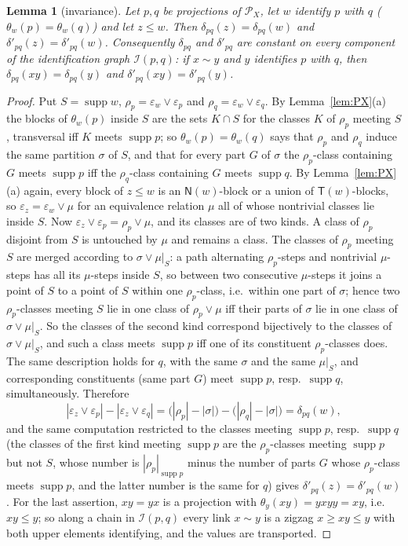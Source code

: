 \documentclass[11pt]{amsart}
\newtheorem{lemma}[theorem]{Lemma}
\theoremstyle{definition}
\renewcommand{\P}{\mathcal{P}}
\newcommand{\supp}{\operatorname{supp}}
\newcommand{\T}{\mathsf{T}}
\newcommand{\N}{\mathsf{N}}
\begin{document}
\begin{lemma}[invariance]\label{lem:count}
Let $p,q$ be projections of $\P_X$, let $w$ identify $p$ with $q$ ($\theta_w(p)=\theta_w(q)$) and let $z\le w$. Then $\delta_{pq}(z)=\delta_{pq}(w)$ and $\delta'_{pq}(z)=\delta'_{pq}(w)$. Consequently $\delta_{pq}$ and $\delta'_{pq}$ are constant on every component of the identification graph $\mathcal I(p,q)$: if $x\sim y$ and $y$ identifies $p$ with $q$, then $\delta_{pq}(xy)=\delta_{pq}(y)$ and $\delta'_{pq}(xy)=\delta'_{pq}(y)$.
\end{lemma}

\begin{proof}
Put $S=\supp w$, $\rho_p=\varepsilon_w\vee\varepsilon_p$ and $\rho_q=\varepsilon_w\vee\varepsilon_q$. By Lemma~\ref{lem:PX}(a) the blocks of $\theta_w(p)$ inside $S$ are the sets $K\cap S$ for the classes $K$ of $\rho_p$ meeting $S$, transversal iff $K$ meets $\supp p$; so $\theta_w(p)=\theta_w(q)$ says that $\rho_p$ and $\rho_q$ induce the same partition $\sigma$ of $S$, and that for every part $G$ of $\sigma$ the $\rho_p$-class containing $G$ meets $\supp p$ iff the $\rho_q$-class containing $G$ meets $\supp q$. By Lemma~\ref{lem:PX}(a) again, every block of $z\le w$ is an $\N(w)$-block or a union of $\T(w)$-blocks, so $\varepsilon_z=\varepsilon_w\vee\mu$ for an equivalence relation $\mu$ all of whose nontrivial classes lie inside $S$. Now $\varepsilon_z\vee\varepsilon_p=\rho_p\vee\mu$, and its classes are of two kinds. A class of $\rho_p$ disjoint from $S$ is untouched by $\mu$ and remains a class. The classes of $\rho_p$ meeting $S$ are merged according to $\sigma\vee\mu|_S$: a path alternating $\rho_p$-steps and nontrivial $\mu$-steps has all its $\mu$-steps inside $S$, so between two consecutive $\mu$-steps it joins a point of $S$ to a point of $S$ within one $\rho_p$-class, i.e.\ within one part of $\sigma$; hence two $\rho_p$-classes meeting $S$ lie in one class of $\rho_p\vee\mu$ iff their parts of $\sigma$ lie in one class of $\sigma\vee\mu|_S$. So the classes of the second kind correspond bijectively to the classes of $\sigma\vee\mu|_S$, and such a class meets $\supp p$ iff one of its constituent $\rho_p$-classes does. The same description holds for $q$, with the same $\sigma$ and the same $\mu|_S$, and corresponding constituents (same part $G$) meet $\supp p$, resp.\ $\supp q$, simultaneously. Therefore
\[
|\varepsilon_z\vee\varepsilon_p|-|\varepsilon_z\vee\varepsilon_q|=\bigl(|\rho_p|-|\sigma|\bigr)-\bigl(|\rho_q|-|\sigma|\bigr)=\delta_{pq}(w),
\]
and the same computation restricted to the classes meeting $\supp p$, resp.\ $\supp q$ (the classes of the first kind meeting $\supp p$ are the $\rho_p$-classes meeting $\supp p$ but not $S$, whose number is $|\rho_p|_{\supp p}$ minus the number of parts $G$ whose $\rho_p$-class meets $\supp p$, and the latter number is the same for $q$) gives $\delta'_{pq}(z)=\delta'_{pq}(w)$. For the last assertion, $xy=yx$ is a projection with $\theta_y(xy)=yxyy=xy$, i.e.\ $xy\le y$; so along a chain in $\mathcal I(p,q)$ every link $x\sim y$ is a zigzag $x\ge xy\le y$ with both upper elements identifying, and the values are transported.
\end{proof}
\end{document}
